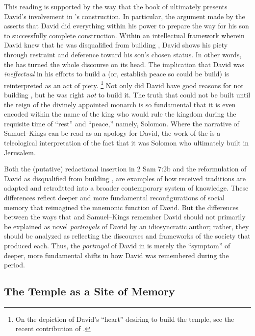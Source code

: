 This reading is supported by the way that the book of \chronicles ultimately presents David's involvement in \thetemple's construction. In particular, the argument made by the \chronicler asserts that David did everything within his power to prepare the way for his son to successfully complete construction. Within an intellectual framework wherein David knew that he was disqualified from building \thetemple, David shows his piety through restraint and deference toward his son's chosen status. In other words, the \chronicler has turned the whole discourse on its head. The implication that David was \emph{ineffectual} in his efforts to build a \temple (or, establish peace so \thetemple could be build) is reinterpreted as an act of piety.%
    \footnote{On the depiction of David's ``heart'' desiring to build the temple, see the recent contribution of \cite{cudworth_cbq2019}.}
Not only did David have good reasons for not building \thetemple, but he was right \emph{not} to build it. The truth that \thetemple could not be built until the reign of the divinely appointed monarch is so fundamental that it is even encoded within the name of the king who would rule the kingdom during the requisite time of ``rest'' and ``peace,'' namely, Solomon. Where the narrative of Samuel--Kings can be read as an apology for David, the work of the \chronicler is a teleological interpretation of the fact that it was Solomon who ultimately built \thetemple in Jerusalem.

Both the (putative) redactional insertion in 2 Sam 7:2b and the reformulation of David as disqualified from building \thetemple, are examples of how received traditions are adapted and retrofitted into a broader contemporary system of knowledge. These differences reflect deeper and more fundamental reconfigurations of social memory that reimagined the mnemonic function of David. But the differences between the ways that \chronicles and Samuel--Kings remember David should not primarily be explained as novel \emph{portrayals} of David by an idiosyncratic author; rather, they should be analyzed as reflecting the discourses and frameworks of the society that produced each. Thus, the \emph{portrayal} of David in \chronicles is merely the ``symptom'' of deeper, more fundamental shifts in how David was remembered during the \secondtemple period. 

\subsection{The Temple as a Site of Memory}

